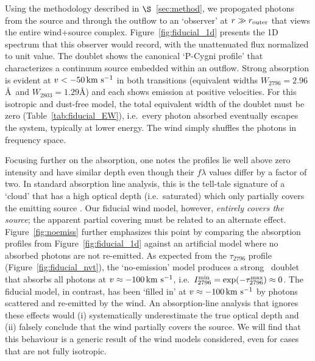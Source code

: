 \documentclass[12pt,preprint]{aastex}
\begin{document}
Using the methodology described in $\S$~\ref{sec:method}, we
propogated photons from the source and through the outflow to an
`observer' at $r \gg r_{\rm outer}$ that views the entire wind+source
complex.  Figure~\ref{fig:fiducial_1d} presents the 1D spectrum
that this observer would record, with the unattenuated flux
normalized to unit value.   The  doublet
shows the canonical `P-Cygni profile' that characterizes a continuum
source embedded within an outflow.  Strong absorption is evident at
$v < -50 \, {\rm km~s^{-1}}$ in both transitions (equivalent widths $W_{2796} =
2.96$\AA\ and $W_{2803} = 1.29$\AA) and each shows emission at
positive velocities.  For this isotropic and dust-free model, the
total equivalent width of the doublet must be zero
(Table~\ref{tab:fiducial_EW}), i.e.\ every photon
absorbed eventually escapes the system, typically at lower
energy.  The wind simply shuffles the photons in frequency space.

Focusing further on the  absorption, one notes the profiles lie
well above zero intensity and have similar depth even though their $f\lambda$
values differ by a factor of two.  In standard absorption line
analysis, this is 
the tell-tale signature of a `cloud' that has a high optical depth (i.e.\
saturated) which only partially covers the emitting source
\citep[e.g.][]{hamann+10}.  Our fiducial wind model, however, 
{\it entirely covers the source}; the apparent partial covering must
be related to an alternate effect.
Figure~\ref{fig:noemiss} further emphasizes this point by comparing the 
absorption profiles from Figure~\ref{fig:fiducial_1d} against an
artificial model where no absorbed photons are not
re-emitted.   As expected from the
$\tau_{2796}$ profile (Figure~\ref{fig:fiducial_nvt}), the
`no-emission' model
produces a strong \mgiid\ doublet that absorbs all photons at
$v \approx -100 \, {\rm km~s^{-1}}$, i.e.\ $I_{2796}^{\rm min} = \exp(-\tau^{\rm
  max}_{2796}) \approx 0$.
The fiducial model, in contrast, has been `filled in' at $v \approx -100
\, {\rm km~s^{-1}}$ by photons scattered and re-emitted by the wind.  An
absorption-line analysis that ignores these effects
\citep[e.g.][]{smn+09} would (i) systematically underestimate the true optical
depth and (ii) falsely conclude that the wind partially covers the
source.  We will find that this
behaviour is a generic result of the wind models considered, even for cases that are
not fully isotropic.
\end{document}
